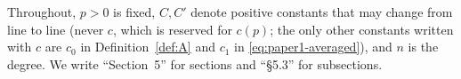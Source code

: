 Throughout, $p>0$ is fixed, $C,C'$ denote positive constants that may change from line to line (never $c$, which is
reserved for $c(p)$; the only other constants written with $c$ are $c_0$ in Definition~\ref{def:A} and $c_1$ in
\eqref{eq:paper1-averaged}), and $n$ is the degree. We write ``Section~5'' for sections and ``\S5.3'' for
subsections.
